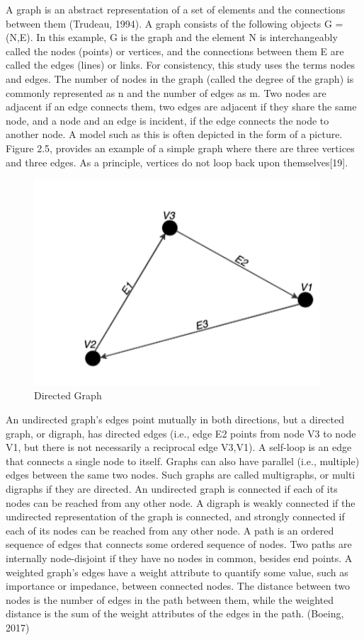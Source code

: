 A graph is an abstract representation of a set of elements and the connections between them (Trudeau, 1994). A graph consists of the following objects G = (N,E). In this example, G is the graph and the element N is interchangeably called the nodes (points) or vertices, and the connections between them E are called the edges (lines) or links. For consistency, this study uses the terms nodes and edges. The number of nodes in the graph (called the degree of the graph) is commonly represented as n and the number of edges as m. Two nodes are adjacent if an edge connects them, two edges are adjacent if they share the same node, and a node and an edge is incident, if the edge connects the node to another node. A model such as this is often depicted in the form of a picture. Figure 2.5, provides an example of a simple graph where there are three vertices and three edges. As a principle, vertices do not loop back upon themselves[19]. 

\begin{figure}[h]
\centering
\includegraphics[width=0.95\textwidth,center]{picture/figure5.png}
\caption[Miniaturtrichter]{Directed Graph}
\label{fig:directedgraph}
\end{figure}

An undirected graph's edges point mutually in both directions, but a directed graph, or digraph, has directed edges (i.e., edge E2 points from node V3 to node V1, but there is not necessarily a reciprocal edge V3,V1). A self-loop is an edge that connects a single node to itself. Graphs can also have parallel (i.e., multiple) edges between the same two nodes. Such graphs are called multigraphs, or multi digraphs if they are directed. An undirected graph is connected if each of its nodes can be reached from any other node. A digraph is weakly connected if the undirected representation of the graph is connected, and strongly connected if each of its nodes can be reached from any other node. A path is an ordered sequence of edges that connects some ordered sequence of nodes. Two paths are internally node-disjoint if they have no nodes in common, besides end points. A weighted graph's edges have a weight attribute to quantify some value, such as importance or impedance, between connected nodes. The distance between two nodes is the number of edges in the path between them, while the weighted distance is the sum of the weight attributes of the edges in the path. (Boeing, 2017)

